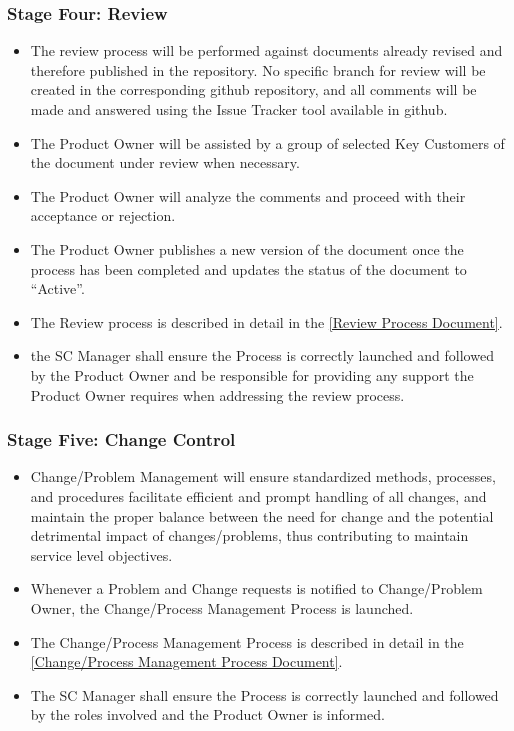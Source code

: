 \documentclass{template/openetcs_article}
\begin{document}
\subsubsection{Stage Four: Review}
\begin{itemize}
\item The review process will be performed against documents already revised and therefore published in the repository. No specific branch for review will be created in the corresponding github repository, and all comments will be made and answered using the Issue Tracker tool available in github.
\item The Product Owner will be assisted by a group of selected Key Customers of the document under review when necessary.
\item The Product Owner will analyze the comments and proceed with their acceptance or rejection.
\item The Product Owner publishes a new version of the document once the process has been completed and  updates the status of the document to “Active”.
\item The Review process is described in detail in the \href{https://github.com/openETCS/governance/tree/master/Review\%20Process}{[Review Process Document]}. 
\item the SC Manager shall ensure the Process is correctly launched and followed by the Product Owner and be responsible for providing any support the Product Owner requires when addressing the review process.
\end{itemize}

\subsubsection{Stage Five: Change Control}
\begin{itemize}
\item Change/Problem Management will ensure standardized methods, processes, and procedures facilitate efficient and prompt handling of all changes, and maintain the proper balance between the need for change and the potential detrimental impact of changes/problems, thus contributing to maintain service level objectives.
\item Whenever a Problem and Change requests is notified to Change/Problem Owner, the Change/Process Management Process is launched. 
\item The Change/Process Management Process is described in detail in the \href{https://github.com/openETCS/governance/tree/master/Change-Problem\%20Process}{[Change/Process Management Process Document]}. 
\item The SC Manager shall ensure the Process is correctly launched and followed by the roles involved and the Product Owner is informed.
\end{itemize}
\end{document}
